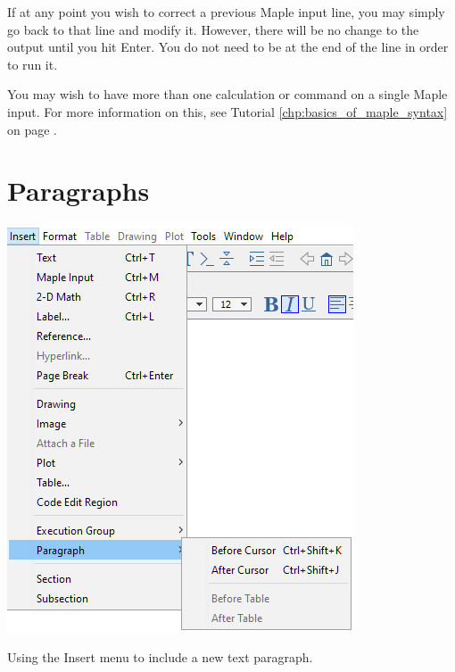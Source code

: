 \begin{maplegroup}
\begin{mapleinput}
\end{mapleinput}
\mapleresult
\begin{maplelatex}
\end{maplelatex}
\end{maplegroup}
\begin{maplegroup}
\begin{mapleinput}
\end{mapleinput}
\mapleresult
\begin{maplelatex}
\end{maplelatex}
\end{maplegroup}

If at any point you wish to correct a previous Maple input line, you may simply go back to that line and modify it. However, there will be no change to the output until you hit Enter. You do not need to be at the end of the line in order to run it.

You may wish to have more than one calculation or command on a single Maple input. For more information on this, see Tutorial \ref{chp:basics_of_maple_syntax} on page \pageref{chp:basics_of_maple_syntax}.

\section{Paragraphs}

\begin{marginfigure}
\includegraphics[scale=0.5]{tutorials/figures/InsertParagraph.png}
\caption{Using the Insert menu to include a new text paragraph.}
\end{marginfigure}

